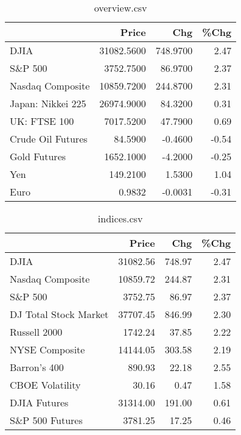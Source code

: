 \documentclass{article}%
\begin{document}
\begin{table}[htbp]%
\caption{overview.csv}%
\centering%
\begin{adjustbox}{width=1\textwidth}%
\begin{tabular}{lrrr}
\toprule
                  &      Price &      Chg &  \%Chg \\
\midrule
             DJIA & 31082.5600 & 748.9700 &  2.47 \\
          S\&P 500 &  3752.7500 &  86.9700 &  2.37 \\
 Nasdaq Composite & 10859.7200 & 244.8700 &  2.31 \\
Japan: Nikkei 225 & 26974.9000 &  84.3200 &  0.31 \\
     UK: FTSE 100 &  7017.5200 &  47.7900 &  0.69 \\
Crude Oil Futures &    84.5900 &  -0.4600 & -0.54 \\
     Gold Futures &  1652.1000 &  -4.2000 & -0.25 \\
              Yen &   149.2100 &   1.5300 &  1.04 \\
             Euro &     0.9832 &  -0.0031 & -0.31 \\
\bottomrule
\end{tabular}
%
\end{adjustbox}%
\end{table}

%


\begin{table}[htbp]%
\caption{indices.csv}%
\centering%
\begin{adjustbox}{width=1\textwidth}%
\begin{tabular}{lrrr}
\toprule
                      &    Price &    Chg &  \%Chg \\
\midrule
                 DJIA & 31082.56 & 748.97 &  2.47 \\
     Nasdaq Composite & 10859.72 & 244.87 &  2.31 \\
              S\&P 500 &  3752.75 &  86.97 &  2.37 \\
DJ Total Stock Market & 37707.45 & 846.99 &  2.30 \\
         Russell 2000 &  1742.24 &  37.85 &  2.22 \\
       NYSE Composite & 14144.05 & 303.58 &  2.19 \\
         Barron's 400 &   890.93 &  22.18 &  2.55 \\
      CBOE Volatility &    30.16 &   0.47 &  1.58 \\
         DJIA Futures & 31314.00 & 191.00 &  0.61 \\
      S\&P 500 Futures &  3781.25 &  17.25 &  0.46 \\
\bottomrule
\end{tabular}
%
\end{adjustbox}%
\end{table}
\end{document}
